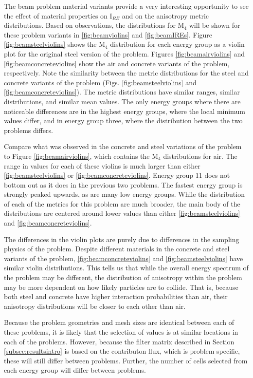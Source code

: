 The beam problem material variants provide a very interesting opportunity to see
the effect of material properties on I$_{RE}$ and on the anisotropy metric
distributions. Based on observations, the distributions for M$_4$ will be shown
for these problem variants in \ref{fig:beamviolins} and \ref{fig:beamIREs}.
Figure \ref{fig:beamsteelviolins} shows the M$_4$ distribution for each energy
group as a violin plot for the original steel version of the problem.
Figures \ref{fig:beamairviolins} and \ref{fig:beamconcreteviolins} show the air
and concrete variants of the problem, respectively. Note the similarity between
the metric distributions for the steel and concrete variants of the problem
(Figs. \ref{fig:beamsteelviolins} and \ref{fig:beamconcreteviolins}). The metric
distributions have similar ranges, similar distributions, and similar mean
values. The only energy groups where there are noticeable differences are in the
highest energy groups, where the local minimum values differ, and in energy
group three, where the distribution between the two problems differs.

Compare
what was observed in the concrete and steel variations of the problem
to Figure \ref{fig:beamairviolins}, which contains the M$_4$ distributions
for air. The range in values for each of these violins is much larger than
either \ref{fig:beamsteelviolins} or \ref{fig:beamconcreteviolins}. Energy group
11 does not bottom out as it does in the previous two problems. The fastest
energy group is strongly peaked upwards, as are many low energy groups. While
the distribution of each of the metrics for this problem are much broader, the
main body of the distributions are centered around lower values than either
\ref{fig:beamsteelviolins} and \ref{fig:beamconcreteviolins}.

The differences in the violin plots are purely due to differences in the
sampling physics of the problem. Despite different materials in the concrete and
steel variants of the problem,
\ref{fig:beamconcreteviolins} and \ref{fig:beamsteelviolins} have similar violin
distributions. This tells us that while the overall energy spectrum of the
problem may be different, the distribution of anisotropy within the problem may
be more dependent on how likely particles are to collide. That is, because both
steel and concrete have higher interaction probabilities than air, their
anisotropy distributions will be closer to each other than air.

Because the problem geometries and mesh sizes are identical between each of
these problems, it is likely that the selection of values is at similar
locations in each of the problems. However, because the filter matrix described
in Section \ref{subsec:resultsintro} is based on the contributon flux, which is
problem specific, these will still differ between problems. Further, the number
of cells selected from each energy group will differ between problems.


